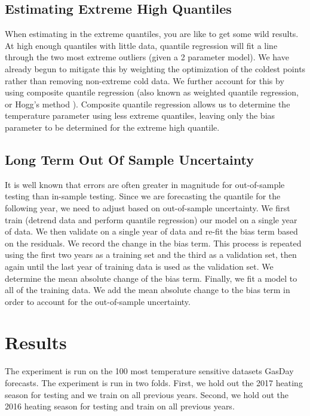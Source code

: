 \documentclass{article}
\begin{document}
\subsection{Estimating Extreme High Quantiles}

When estimating in the extreme quantiles, you are like to get some wild results. At high enough quantiles with little data, quantile regression will fit a line through the two most extreme outliers (given a 2 parameter model). We have already begun to mitigate this by weighting the optimization of the coldest points rather than removing non-extreme cold data. We further account for this by using composite quantile regression (also known as weighted quantile regression, or Hogg's method \cite{koenker2004quantile}). Composite quantile regression allows us to determine the temperature parameter using less extreme quantiles, leaving only the bias parameter to be determined for the extreme high quantile.

\subsection{Long Term Out Of Sample Uncertainty} \label{longterm}

It is well known that errors are often greater in magnitude for out-of-sample testing than in-sample testing. Since we are forecasting the quantile for the following year, we need to adjust based on out-of-sample uncertainty. We first train (detrend data and perform quantile regression) our model on a single year of data. We then validate on a single year of data and re-fit the bias term based on the residuals. We record the change in the bias term. This process is repeated using the first two years as a training set and the third as a validation set, then again until the last year of training data is used as the validation set. We determine the mean absolute change of the bias term. Finally, we fit a model to all of the training data. We add the mean absolute change to the bias term in order to account for the out-of-sample uncertainty.

\section{Results}

The experiment is run on the 100 most temperature sensitive datasets GasDay forecasts. The experiment is run in two folds. First, we hold out the 2017 heating season for testing and we train on all previous years. Second, we hold out the 2016 heating season for testing and train on all previous years.
\end{document}
